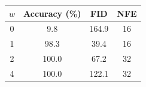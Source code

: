 \centering
\begin{tabular}{cccc}
    \toprule
    \(w\) & Accuracy (\%) & FID   & NFE \\
    \midrule
    0     & 9.8           & 164.9 & 16  \\
    1     & 98.3          & 39.4  & 16  \\
    2     & 100.0         & 67.2  & 32  \\
    4     & 100.0         & 122.1 & 32  \\
    \bottomrule
\end{tabular}
